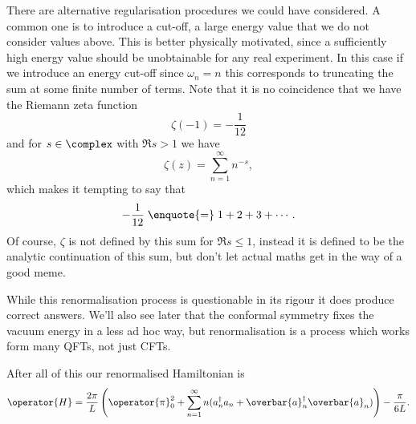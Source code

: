 \documentclass[fleqn]{NotesClass}
\newcommand{\hermit}{{\dagger}}
\begin{document}
    There are alternative regularisation procedures we could have considered.
    A common one is to introduce a cut-off, a large energy value that we do not consider values above.
    This is better physically motivated, since a sufficiently high energy value should be unobtainable for any real experiment.
    In this case if we introduce an energy cut-off since \(\omega_n = n\) this corresponds to truncating the sum at some finite number of terms.
    Note that it is no coincidence that we have the Riemann zeta function
    \begin{equation}
        \zeta(-1) = -\frac{1}{12}
    \end{equation}
    and for \(s \in \complex\) with \(\Re{s} > 1\) we have
    \begin{equation}
        \zeta(z) = \sum_{n=1}^{\infty} n^{-s},
    \end{equation}
    which makes it tempting to say that
    \begin{equation}
        -\frac{1}{12} \mathrel{\enquote{{=}}} 1 + 2 + 3 + \dotsb.
    \end{equation}
    Of course, \(\zeta\) is not defined by this sum for \(\Re{s} \le 1\), instead it is defined to be the analytic continuation of this sum, but don't let actual maths get in the way of a good meme.
    
    While this renormalisation process is questionable in its rigour it does produce correct answers.
    We'll also see later that the conformal symmetry fixes the vacuum energy in a less ad hoc way, but renormalisation is a process which works form many QFTs, not just CFTs.
    
    After all of this our renormalised Hamiltonian is
    \begin{equation}
        \operator{H} = \frac{2\pi}{L} \left( \operator{\pi}_0^2 + \sum_{n=1}^{\infty} n(a_n^{\hermit}a_n + \overbar{a}_n^{\hermit}\overbar{a}_n) \right) - \frac{\pi}{6L}.
    \end{equation}
    
\end{document}
